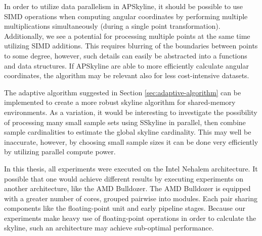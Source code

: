 \documentclass[12pt,a4paper,twoside]{report}
\begin{document}
In order to utilize data parallelism in APSkyline, it should be
possible to use SIMD operations when computing angular coordinates by
performing multiple multiplications simultaneously (during a single
point transformation). Additionally, we see a potential for processing
multiple points at the same time utilizing SIMD additions. This
requires blurring of the boundaries between points to some degree,
however, such details can easily be abstracted into a functions and
data structures. If APSkyline are able to more efficiently calculate
angular coordinates, the algorithm may be relevant also for less
cost-intensive datasets.

The adaptive algorithm suggested in Section
\ref{sec:adaptive-algorithm} can be implemented to create a more
robust skyline algorithm for shared-memory environments. As a
variation, it would be interesting to investigate the possibility of
processing many small sample sets using SSkyline in parallel, then
combine sample cardinalities to estimate the global skyline
cardinality. This may well be inaccurate, however, by choosing small
sample sizes it can be done very efficiently by utilizing parallel
compute power.

In this thesis, all experiments were executed on the Intel Nehalem
architecture. It possible that one would achieve different results by
executing experiments on another architecture, like the AMD Bulldozer.
The AMD Bulldozer is equipped with a greater number of cores, grouped
pairwise into modules. Each pair sharing components like the
floating-point unit and early pipeline stages. Because our
experiments make heavy use of floating-point operations in order to
calculate the skyline, such an architecture may achieve sub-optimal
performance. 

\cleardoublepage



\end{document}
